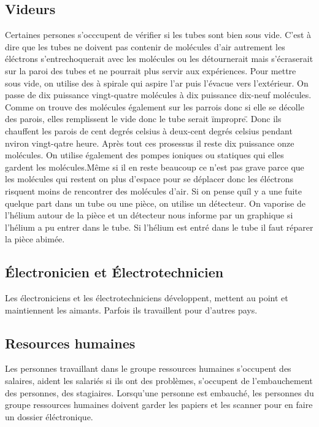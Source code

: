 		\subsection{Videurs}
			Certaines persones s'occcupent de vérifier si les tubes sont bien sous vide. C'est à dire que les tubes ne doivent pas contenir de molécules d'air autrement les éléctrons s'entrechoquerait avec les molécules ou les détournerait mais s'écraserait sur la paroi des tubes et ne pourrait plus servir aux expériences.
			Pour mettre sous vide, on utilise des à spirale qui aspire l'ar puis l'évacue vers l'extérieur. On passe de dix puissance vingt-quatre molécules à dix puissance dix-neuf molécules. Comme on trouve des molécules également sur les parrois donc si elle se décolle des parois, elles remplissent le vide donc le tube serait \"impropre\". Donc ils chauffent les parois de cent degrés celsius à deux-cent degrés celsius pendant nviron vingt-qatre heure. Après tout ces prosessus il reste dix puissance onze molécules. On utilise également des pompes ioniques ou statiques qui elles gardent les molécules.Même si il en reste beaucoup ce n'est pas grave parce que les molécules qui restent on plus d'espace pour se déplacer donc les éléctrons risquent moins de rencontrer des molécules d'air. Si on pense quíl y a une fuite quelque part dans un tube ou une pièce, on utilise un détecteur. On vaporise de l'hélium autour de la pièce et un détecteur nous informe par un graphique si l'hélium a pu entrer dans le tube. Si l'hélium est entré dans le tube il faut réparer la pièce abimée.  
		\subsection{Électronicien et Électrotechnicien}
			Les électroniciens et les électrotechniciens développent, mettent au point et maintiennent les aimants. Parfois ils travaillent pour d'autres pays.
		\subsection{Resources humaines}
			Les personnes travaillant dans le groupe ressources humaines s'occupent des salaires, aident les salariés si ils ont des problèmes, s'occupent de l'embauchement des personnes, des stagiaires. Lorsqu'une personne est embauché, les personnes du groupe ressources humaines doivent garder les papiers et les scanner pour en faire un dossier éléctronique. 


	
		
		
